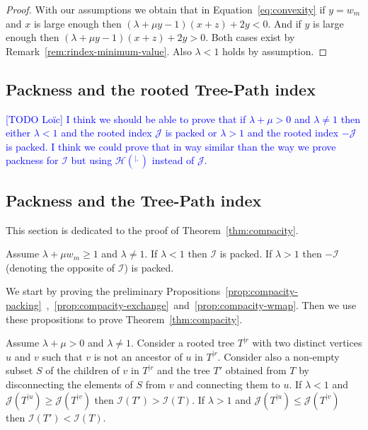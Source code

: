 \documentclass[11 pt]{modarticle}
\newcommand{\wmin}{w_m}
\newcommand{\rtree}[2]{{#1}^{\lvert #2}}
\newcommand{\indexsymbol}{\mathcal{I}}
\newcommand{\tindex}[1]{\indexsymbol(#1)}
\newcommand{\rindexsymbol}{\mathcal{J}}
\newcommand{\rindex}[2]{\rindexsymbol(\rtree{#2}{#1})}
\newcommand{\aindexsymbol}{\mathcal{H}}
\newcommand{\aindex}[3]{\aindexsymbol(\rtree{#3}{#1, #2})}
\newcommand{\ldtodo}[1]{\textcolor{blue}{{\footnotesize [TODO Loïc]} #1}}
\begin{document}
\begin{proof}
With our assumptions we obtain that in Equation~\eqref{eq:convexity} if $y = \wmin$ and $x$ is large enough then $(\lambda + \mu y - 1)(x+z) + 2y < 0$. And if $y$ is large enough then $(\lambda + \mu y - 1)(x+z) + 2y > 0$. Both cases exist by Remark~\ref{rem:rindex-minimum-value}. Also $\lambda < 1$ holds by assumption.
\end{proof}

\subsection{Packness and the rooted Tree-Path index}

\ldtodo{I think we should be able to prove that if $\lambda + \mu > 0$ and $\lambda \neq 1$ then either $\lambda < 1$ and the rooted index $\rindexsymbol$ is packed or $\lambda > 1$ and the rooted index $-\rindexsymbol$ is packed. I think we could prove that in way similar than the way we prove packness for $\indexsymbol$ but using $\aindex{}{}{}$ instead of $\rindexsymbol$.}












\subsection{Packness and the Tree-Path index}

This section is dedicated to the proof of Theorem~\ref{thm:compacity}.

\begin{thm}\label{thm:compacity}
 Assume $\lambda + \mu \wmin \geq 1$ and $\lambda \neq 1$. If $\lambda < 1$ then $\indexsymbol$ is packed. If $\lambda > 1$ then $-\indexsymbol$ (denoting the opposite of $\indexsymbol$) is packed.
\end{thm}


We start by proving the preliminary Propositions~\ref{prop:compacity-packing}~,~\ref{prop:compacity-exchange}~and~\ref{prop:compacity-wmap}. Then we use these propositions to prove Theorem~\ref{thm:compacity}.


\begin{prop}\label{prop:compacity-packing}
Assume $\lambda + \mu > 0$ and $\lambda \neq 1$. Consider a rooted tree $\rtree{T}{r}$ with two distinct vertices $u$ and $v$ such that $v$ is not an ancestor of $u$ in $\rtree{T}{r}$. Consider also a non-empty subset $S$ of the children of $v$ in $\rtree{T}{r}$ and the tree $T'$ obtained from $T$ by disconnecting the elements of $S$ from $v$ and connecting them to $u$. If $\lambda < 1$ and $\rindex{u}{T} \geq \rindex{v}{T}$ then $\tindex{T'} > \tindex{T}$. If $\lambda > 1$ and $\rindex{u}{T} \leq \rindex{v}{T}$ then $\tindex{T'} < \tindex{T}$.
\end{prop}
\end{document}
